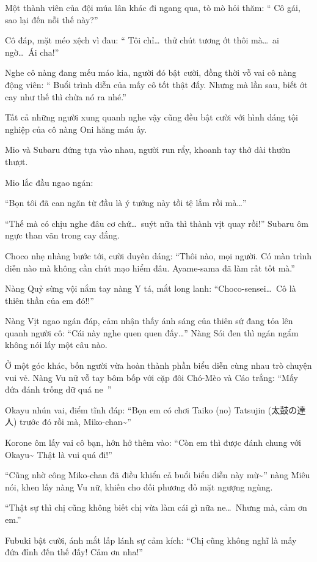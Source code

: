 \documentclass[../main.tex]{subfiles}
\begin{document}
Một thành viên của đội múa lân khác đi ngang qua, tò mò hỏi thăm: ``{\color{red} Cô gái, sao lại đến nỗi thế này?}''

Cô đáp, mặt méo xệch vì đau: ``{\color{red} Tôi chỉ\dots\ thử chút tương ớt thôi mà\dots\ ai ngờ\dots\ Ái cha!}''

Nghe cô nàng đang mếu máo kia, người đó bật cười, đồng thời vỗ vai cô nàng động viên: ``{\color{red} Buổi trình diễn của mấy cô tốt thật đấy. Nhưng mà lần sau, biết ớt cay như thế thì chừa nó ra nhé.}''

Tất cả những người xung quanh nghe vậy cũng đều bật cười với hình dáng tội nghiệp của cô nàng Oni hăng máu ấy.

Mio và Subaru đứng tựa vào nhau, người run rẩy, khoanh tay thở dài thườn thượt.

Mio lắc đầu ngao ngán:

``Bọn tôi đã can ngăn từ đầu là ý tưởng này tồi tệ lắm rồi mà\dots''

``Thế mà có chịu nghe đâu cơ chứ\dots\ suýt nữa thì thành vịt quay rồi!'' Subaru ôm ngực than vãn trong cay đắng.

Choco nhẹ nhàng bước tới, cười duyên dáng: ``Thôi nào, mọi người. Có màn trình diễn nào mà không cần chút mạo hiểm đâu. Ayame-sama đã làm rất tốt mà.''

Nàng Quỷ sừng vội nắm tay nàng Y tá, mắt long lanh: ``Choco-sensei\dots\ Cô là thiên thần của em đó!!''

Nàng Vịt ngao ngán đáp, cảm nhận thấy ánh sáng của thiên sứ đang tỏa lên quanh người cô: ``Cái này nghe quen quen đấy\dots'' Nàng Sói đen thì ngán ngẩm không nói lấy một câu nào.

Ở một góc khác, bốn người vừa hoàn thành phần biểu diễn cùng nhau trò chuyện vui vẻ. Nàng Vu nữ vỗ tay bôm bốp với cặp đôi Chó-Mèo và Cáo trắng: ``Mấy đứa đánh trống dữ quá ne~''

Okayu nhún vai, điểm tĩnh đáp: ``Bọn em có chơi Taiko (no) Tatsujin (太鼓の達人) trước đó rồi mà, Miko-chan\~{}''

Korone ôm lấy vai cô bạn, hớn hở thêm vào: ``Còn em thì được đánh chung với Okayu\~{} Thật là vui quá đi!''

``Cũng nhờ công Miko-chan đã điều khiển cả buổi biểu diễn này mừ\~{}'' nàng Miêu nói, khen lấy nàng Vu nữ, khiến cho đối phương đỏ mặt ngượng ngùng.

``Thật sự thì chị cũng không biết chị vừa làm cái gì nữa ne\dots\ Nhưng mà, cảm ơn em.''

Fubuki bật cười, ánh mắt lấp lánh sự cảm kích: ``Chị cũng không nghĩ là mấy đứa đỉnh đến thế đấy! Cảm ơn nha!''
\end{document}
